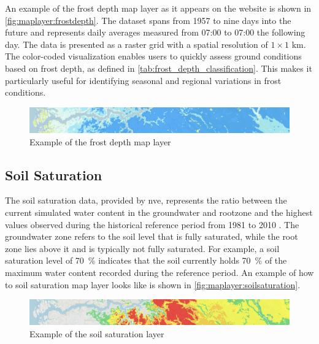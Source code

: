 An example of the frost depth map layer as it appears on the website is shown in \autoref{fig:maplayer:frostdepth}. The dataset spans from 1957 to nine days into the future and represents daily averages measured from 07:00 to 07:00 the following day. The data is presented as a raster grid with a spatial resolution of $1 \times 1$ km. The color-coded visualization enables users to quickly assess ground conditions based on frost depth, as defined in \autoref{tab:frost_depth_classification}. This makes it particularly useful for identifying seasonal and regional variations in frost conditions.

\begin{figure}[h]
    \centering
    \includegraphics[width=1\linewidth]{images/maplayers/frostdepth.png}
    \caption{Example of the frost depth map layer}
    \label{fig:maplayer:frostdepth}
\end{figure}

\subsection{Soil Saturation}\label{subsec:soilsaturation}

The soil saturation data, provided by \acrshort{nve}, represents the ratio between the current simulated water content in the \gls{groundwater} and \gls{rootzone} and the highest values observed during the historical reference period from 1981 to 2010 \cite{nve2025waterdata}. The groundwater zone refers to the soil level that is fully saturated, while the root zone lies above it and is typically not fully saturated. For example, a soil saturation level of \qty{70}{\percent} indicates that the soil currently holds \qty{70}{\percent} of the maximum water content recorded during the reference period. An example of how to soil saturation map layer looks like is shown in \autoref{fig:maplayer:soilsaturation}.

\begin{figure}[h]
    \centering
    \includegraphics[width=1\linewidth]{images/maplayers/soilmoisture.png}
    \caption{Example of the soil saturation layer}
    \label{fig:maplayer:soilsaturation}
\end{figure}

